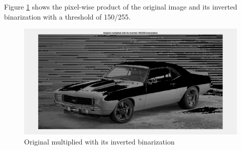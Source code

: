 Figure \ref{fig:task21} shows the pixel-wise product of the original image and its inverted binarization with a threshold of 150/255.

\begin{figure}[!hbt]
  \includegraphics[width=\textwidth]{./img/task21.png}
  \caption{Original multiplied with its inverted binarization}
  \label{fig:task21}
\end{figure}